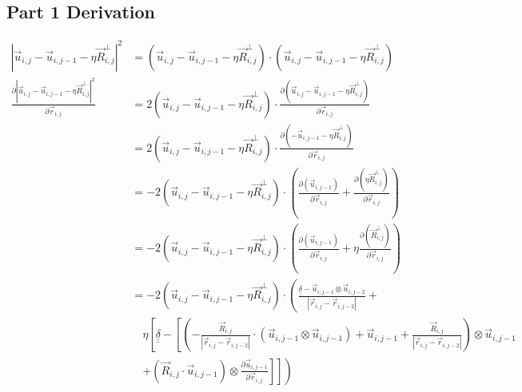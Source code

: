 \documentclass{article}
\renewcommand{\ij}{_{i,j}}
\newcommand{\ijj}{_{i,j-1}}
\newcommand{\ijjj}{_{i,j-2}}
\newcommand{\magn}[1]{\left\vert #1 \right\vert }
\renewcommand{\part}[2]{\frac{\partial #1 }{\partial #2}}
\newcommand{\ten}[1]{\underline{\underline{#1}}}
\newcommand{\rij}{\vec{r} \ij}
\newcommand{\Rij}{\vec{R} \ij}
\newcommand{\rijjj}{\vec{r} \ijjj}
\newcommand{\uij}{\vec{u} \ij}
\newcommand{\uijj}{\vec{u} \ijj}
\newcommand{\uijjj}{\vec{u} \ijjj}
\begin{document}
\subsection{Part 1 Derivation}

\begin{align*}
  \magn{\uij - \uijj - \eta \Rij^\perp}^2 
  &=
  \left(\uij - \uijj - \eta \Rij^\perp\right)
  \cdot 
  \left(\uij - \uijj - \eta \Rij^\perp\right)
  \\
  \part{\magn{\uij - \uijj - \eta \Rij^\perp}^2 }{
    \rij 
  }
  &=
  2\left(\uij - \uijj - \eta \Rij^\perp\right) \cdot
  \part{\left(\uij - \uijj - \eta \Rij^\perp\right)}{\rij}
  \\
  &=
  2\left(\uij - \uijj - \eta \Rij^\perp\right) \cdot
  \part{\left(- \uijj - \eta \Rij^\perp\right)}{\rij}
  \\
  &=
  -
  2\left(\uij - \uijj - \eta \Rij^\perp\right) \cdot
  \left(
  \part{\left(\uijj \right)}{\rij}
  +
  \part{\left( \eta \Rij^\perp\right)}{\rij}
  \right)
  \\
  &=
  -
  2\left(\uij - \uijj - \eta \Rij^\perp\right) \cdot
  \left(
  \part{\left(\uijj \right)}{\rij}
  +
  \eta
  \part{\left( \Rij^\perp\right)}{\rij}
  \right)
  \\
  &=
  -
  2\left(\uij - \uijj - \eta \Rij^\perp\right) \cdot
  \left(
  \frac{\ten{\delta} - \uijj \otimes \uijjj}{\magn{\rij - \rijjj}}
  + \right. \\
  & \quad 
  \left. 
  \eta
  \left[
  \ten{\delta} 
  -
  \left[
  \left(
  -\frac{\vec{R} \ij}{\magn{\rij - \rijjj}} \cdot (\uijj \otimes \uijj ) 
  +  \uijj
  +  \frac{\Rij}{\magn{\rij - \rijjj}}
  \right) \otimes \uijj
  \right.
  \right. 
  \right. 
  \\
  & 
  \quad
  \left. 
  \left.
  \left.
  +  
  \left(\vec{R}\ij \cdot \vec{u} \ijj \right)
  \otimes 
  {\part{\vec{u} \ijj }{\vec{r}\ij} }
  \right]
  \right]
  \right)
\end{align*}
\end{document}
